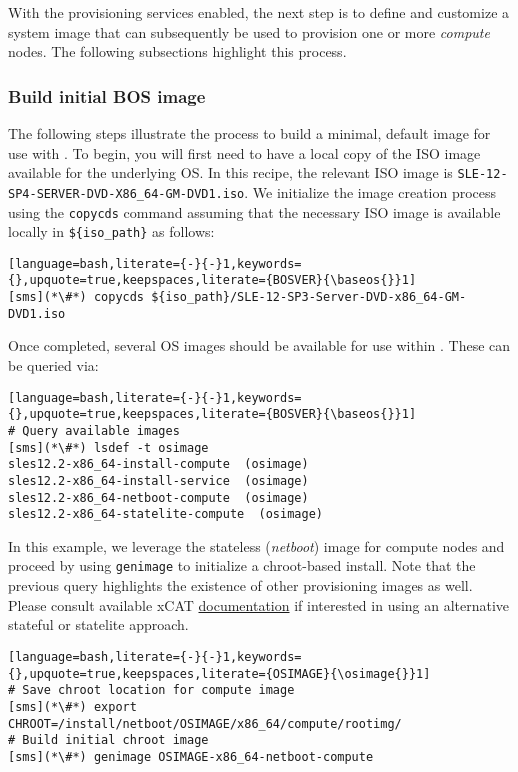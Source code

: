 
With the provisioning services enabled, the next step is to define and customize a system image that can subsequently be
used to provision one or more {\em compute} nodes. The following subsections highlight this process.

\subsubsection{Build initial BOS image} \label{sec:assemble_bos}
The following steps illustrate the process to build a minimal, default image for use with \xCAT{}. To begin, you will
first need to have a local copy of the ISO image available for the underlying OS. In this recipe, the relevant ISO image
is \texttt{SLE-12-SP4-SERVER-DVD-X86\_64-GM-DVD1.iso}. We initialize the image
creation process using the \texttt{copycds} command assuming that the necessary ISO image is available locally in
\texttt{\$\{iso\_path\}} as follows:

\begin{lstlisting}[language=bash,literate={-}{-}1,keywords={},upquote=true,keepspaces,literate={BOSVER}{\baseos{}}1]
[sms](*\#*) copycds ${iso_path}/SLE-12-SP3-Server-DVD-x86_64-GM-DVD1.iso
\end{lstlisting}

\noindent Once completed, several OS images should be available for use within \xCAT{}. These can be queried via:

\begin{lstlisting}[language=bash,literate={-}{-}1,keywords={},upquote=true,keepspaces,literate={BOSVER}{\baseos{}}1]
# Query available images
[sms](*\#*) lsdef -t osimage
sles12.2-x86_64-install-compute  (osimage)
sles12.2-x86_64-install-service  (osimage)
sles12.2-x86_64-netboot-compute  (osimage)
sles12.2-x86_64-statelite-compute  (osimage)
\end{lstlisting}

In this example, we leverage the stateless ({\em netboot}) image for compute nodes and proceed by using
\texttt{genimage} to initialize a chroot-based install. Note that the previous query highlights the existence of other
provisioning images as well. Please consult available xCAT
\href{https://xcat-docs.readthedocs.io/en/stable/}{\color{blue} documentation} if interested in using an alternative
stateful or statelite approach.
\newpage

\begin{lstlisting}[language=bash,literate={-}{-}1,keywords={},upquote=true,keepspaces,literate={OSIMAGE}{\osimage{}}1]
# Save chroot location for compute image
[sms](*\#*) export CHROOT=/install/netboot/OSIMAGE/x86_64/compute/rootimg/
# Build initial chroot image
[sms](*\#*) genimage OSIMAGE-x86_64-netboot-compute
\end{lstlisting}
